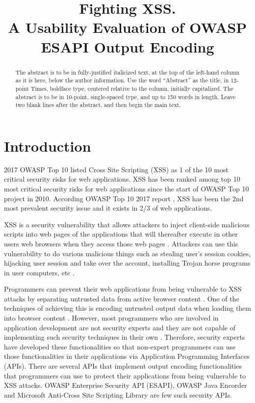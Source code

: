 \documentclass[10pt]{article}
\title{Fighting XSS.\\
\large A Usability Evaluation of OWASP ESAPI Output Encoding}
\date{}
\begin{document}
\maketitle
\begin{abstract}
The abstract is to be in fully-justified italicized text, at the top of the left-hand column as it is here, below the author information. Use the word “Abstract” as the title, in 12-point Times, boldface type, centered relative to the column, initially capitalized. The abstract is to be in 10-point, single-spaced type, and up to 150 words in length. Leave two blank lines after the abstract, and then begin the main text. 

\end{abstract}

\section{Introduction}

2017 OWASP Top 10 \cite{owasp10application} listed Cross Site Scripting (XSS) as 1 of the 10 most critical security risks for web applications. XSS has been ranked among top 10 most critical security risks for web applications since the start of OWASP Top 10 project in 2010. According OWASP Top 10 2017 report \cite{owasp10application}, XSS has been the 2nd most prevalent security issue and it exists in 2/3 of web applications. 

XSS is a security vulnerability that allows attackers to inject client-side malicious scripts into web pages of the applications that will thereafter execute in other users web browsers when they access those web pages \cite{owasp10xss}. Attackers can use this vulnerability to do various malicious things such as stealing user's session cookies, hijacking user session and take over the account, installing Trojan horse programs in user computers, etc \cite{owasp10xss}.

Programmers can prevent their web applications from being vulnerable to XSS attacks by separating untrusted data from active browser content \cite{owasp10application}. One of the techniques of achieving this is encoding untrusted output data when loading them into browser content \cite{owasp10application, owasp10cheat}. However, most programmers who are involved in application development are not security experts and they are not capable of implementing such security techniques in their own \cite{wurster}. Therefore, security experts have developed these functionalities so that non-expert programmers can use those functionalities in their applications via Application Programming Interfaces (APIs). There are several APIs that implement output encoding functionalities that programmers can use to protect their applications from being vulnerable to XSS attacks. OWASP Enterprise Security API (ESAPI), OWASP Java Encorder and Microsoft Anti-Cross Site Scripting Library are few such security APIs.
\end{document}
